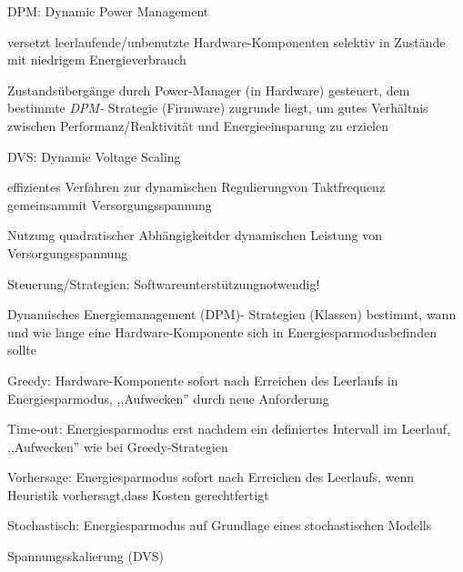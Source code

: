 \documentclass[a4paper]{article}
\begin{document}
\begin{multicols}{3}
    \begin{itemize*}
        \item
        DPM: Dynamic Power Management
        \begin{itemize*}
            \item versetzt leerlaufende/unbenutzte Hardware-Komponenten selektiv in Zustände mit niedrigem Energieverbrauch
            \item Zustandsübergänge durch Power-Manager (in Hardware) gesteuert, dem bestimmte \emph{DPM-} Strategie (Firmware) zugrunde liegt, um gutes Verhältnis zwischen Performanz/Reaktivität und Energieeinsparung zu erzielen
        \end{itemize*}
        \item
        DVS: Dynamic Voltage Scaling
        \begin{itemize*}
            \item effizientes Verfahren zur dynamischen Regulierungvon Taktfrequenz gemeinsammit Versorgungsspannung
            \item Nutzung quadratischer Abhängigkeitder dynamischen Leistung von Versorgungsspannung
            \item Steuerung/Strategien: Softwareunterstützungnotwendig!
        \end{itemize*}
    \end{itemize*}

    Dynamisches Energiemanagement (DPM)- Strategien (Klassen) bestimmt, wann
    und wie lange eine Hardware-Komponente sich in Energiesparmodusbefinden
    sollte

    \begin{itemize*}
        \item
        Greedy: Hardware-Komponente sofort nach Erreichen des Leerlaufs in
        Energiesparmodus, ,,Aufwecken'' durch neue Anforderung
        \item
        Time-out: Energiesparmodus erst nachdem ein definiertes Intervall im
        Leerlauf, ,,Aufwecken'' wie bei Greedy-Strategien
        \item
        Vorhersage: Energiesparmodus sofort nach Erreichen des Leerlaufs, wenn
        Heuristik vorhersagt,dass Kosten gerechtfertigt
        \item
        Stochastisch: Energiesparmodus auf Grundlage eines stochastischen
        Modells
    \end{itemize*}

    Spannungsskalierung (DVS)


\end{multicols}
\end{document}
